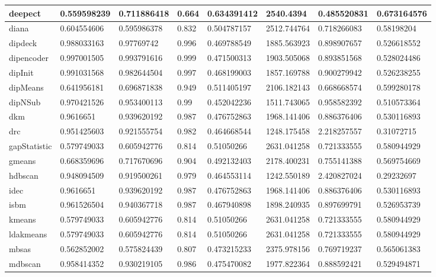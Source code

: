 \begin{table}[H]
\begin{tabular}{|l|l|l|l|l|l|l|l|}
\hline
deepect & 0.559598239 & 0.711886418 & 0.664 & 0.634391412 & 2540.4394 & 0.485520831 & 0.673164576 \\
\hline
diana & 0.604554606 & 0.595986378 & 0.832 & 0.504787157 & 2512.744764 & 0.718266083 & 0.58198204 \\
\hline
dipdeck & 0.988033163 & 0.97769742 & 0.996 & 0.469788549 & 1885.563923 & 0.898907657 & 0.526618552 \\
\hline
dipencoder & 0.997001505 & 0.993791616 & 0.999 & 0.471500313 & 1903.505068 & 0.893851568 & 0.528024486 \\
\hline
dipInit & 0.991031568 & 0.982644504 & 0.997 & 0.468199003 & 1857.169788 & 0.900279942 & 0.526238255 \\
\hline
dipMeans & 0.641956181 & 0.696871838 & 0.949 & 0.511405197 & 2106.182143 & 0.668668574 & 0.599280178 \\
\hline
dipNSub & 0.970421526 & 0.953400113 & 0.99 & 0.452042236 & 1511.743065 & 0.958582392 & 0.510573364 \\
\hline
dkm & 0.9616651 & 0.939620192 & 0.987 & 0.476752863 & 1968.141406 & 0.886376406 & 0.530116893 \\
\hline
drc & 0.951425603 & 0.921555754 & 0.982 & 0.464668544 & 1248.175458 & 2.218257557 & 0.31072715 \\
\hline
gapStatistic & 0.579749033 & 0.605942776 & 0.814 & 0.51050266 & 2631.041258 & 0.721333555 & 0.580944929 \\
\hline
gmeans & 0.668359696 & 0.717670696 & 0.904 & 0.492132403 & 2178.400231 & 0.755141388 & 0.569754669 \\
\hline
hdbscan & 0.948094509 & 0.919500261 & 0.979 & 0.464553114 & 1242.550189 & 2.420827024 & 0.29232697 \\
\hline
idec & 0.9616651 & 0.939620192 & 0.987 & 0.476752863 & 1968.141406 & 0.886376406 & 0.530116893 \\
\hline
isbm & 0.961526504 & 0.940367718 & 0.987 & 0.467940898 & 1898.240935 & 0.897699791 & 0.526953739 \\
\hline
kmeans & 0.579749033 & 0.605942776 & 0.814 & 0.51050266 & 2631.041258 & 0.721333555 & 0.580944929 \\
\hline
ldakmeans & 0.579749033 & 0.605942776 & 0.814 & 0.51050266 & 2631.041258 & 0.721333555 & 0.580944929 \\
\hline
mbsas & 0.562852002 & 0.575824439 & 0.807 & 0.473215233 & 2375.978156 & 0.769719237 & 0.565061383 \\
\hline
mdbscan & 0.958414352 & 0.930219105 & 0.986 & 0.475470082 & 1977.822364 & 0.888592421 & 0.529494871 \\

\end{tabular}
\end{table}
